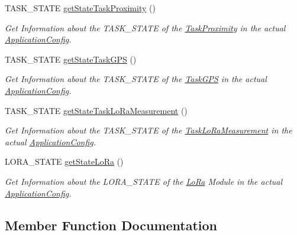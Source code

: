 \begin{DoxyCompactItemize}
T\+A\+S\+K\+\_\+\+S\+T\+A\+T\+E \hyperlink{class_application_config_af9e911578148a80788e776a66f1b89f7}{get\+State\+Task\+Proximity} ()
\begin{DoxyCompactList}\small\item\em Get Information about the T\+A\+S\+K\+\_\+\+S\+T\+A\+T\+E of the \hyperlink{class_task_proximity}{Task\+Proximity} in the actual \hyperlink{class_application_config}{Application\+Config}. \end{DoxyCompactList}\item 
T\+A\+S\+K\+\_\+\+S\+T\+A\+T\+E \hyperlink{class_application_config_a7b26e22806ecf91751723d523777b414}{get\+State\+Task\+G\+P\+S} ()
\begin{DoxyCompactList}\small\item\em Get Information about the T\+A\+S\+K\+\_\+\+S\+T\+A\+T\+E of the \hyperlink{class_task_g_p_s}{Task\+G\+P\+S} in the actual \hyperlink{class_application_config}{Application\+Config}. \end{DoxyCompactList}\item 
T\+A\+S\+K\+\_\+\+S\+T\+A\+T\+E \hyperlink{class_application_config_a54dadbe8b8f4a71a3a90e8b34f6144a6}{get\+State\+Task\+Lo\+Ra\+Measurement} ()
\begin{DoxyCompactList}\small\item\em Get Information about the T\+A\+S\+K\+\_\+\+S\+T\+A\+T\+E of the \hyperlink{class_task_lo_ra_measurement}{Task\+Lo\+Ra\+Measurement} in the actual \hyperlink{class_application_config}{Application\+Config}. \end{DoxyCompactList}\item 
L\+O\+R\+A\+\_\+\+S\+T\+A\+T\+E \hyperlink{class_application_config_a3f649b582f5b839376787799117c7068}{get\+State\+Lo\+Ra} ()
\begin{DoxyCompactList}\small\item\em Get Information about the L\+O\+R\+A\+\_\+\+S\+T\+A\+T\+E of the \hyperlink{class_lo_ra}{Lo\+Ra} Module in the actual \hyperlink{class_application_config}{Application\+Config}. \end{DoxyCompactList}\end{DoxyCompactItemize}


\subsection{Member Function Documentation}
\hypertarget{class_application_config_a0b25f55661cd3218c2fa1f8b7560c9a5}{}
